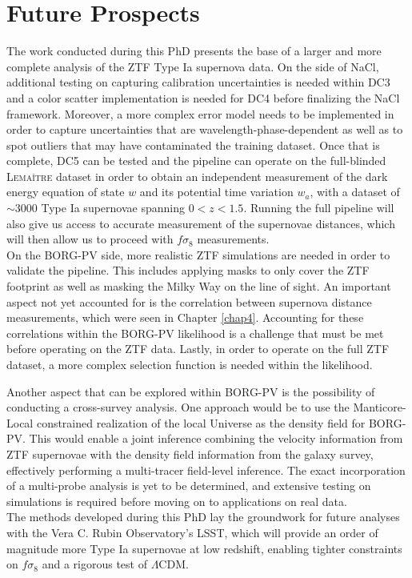 \section{Future Prospects}

The work conducted during this PhD presents the base of a larger and more complete analysis of the ZTF Type Ia supernova data. On the side of NaCl, 
additional testing on capturing calibration uncertainties is needed within DC3 and a color scatter implementation is needed for DC4 before finalizing the NaCl 
framework.  
Moreover, a more complex 
error model needs to be implemented in order to capture uncertainties that are wavelength-phase-dependent as well as to spot outliers that may have 
contaminated the training dataset. 
Once that is complete, DC5 can be tested and the pipeline can operate on the full-blinded \textsc{Lemaître} dataset 
in order to obtain 
an independent measurement of the dark energy equation of state $w$ 
and its potential time variation $w_a$, with a dataset of $\sim 3000$ 
Type Ia supernovae spanning $0 < z < 1.5$. 
Running the full pipeline will also give us access to accurate measurement of the supernovae distances, which will then allow us to proceed with $f\sigma_8$ measurements. \\


On the BORG-PV side, more realistic ZTF simulations are needed in order to validate the pipeline. This includes applying masks to only cover the ZTF footprint 
as well as masking the Milky Way on the line of sight. 
An important aspect not yet accounted for is the correlation between 
supernova distance measurements, which were seen in Chapter \ref{chap4}. 
Accounting for these correlations within the BORG-PV likelihood is a challenge that must be met before operating on the ZTF data. 
Lastly, in order to operate on the full ZTF dataset, a more complex selection function is needed within the likelihood. 

Another aspect that can be explored within BORG-PV is the possibility of conducting a cross-survey analysis. 
One approach would be to use the Manticore-Local constrained realization 
of the local Universe as the density field for BORG-PV. 
This would enable a joint inference 
combining the velocity information from ZTF supernovae with the density 
field information from the galaxy survey, effectively performing a 
multi-tracer field-level inference. 
The exact incorporation of a multi-probe analysis is yet to be determined, and extensive testing on simulations is required before moving on to applications on real data. \\

The methods developed during this PhD lay the groundwork for future 
analyses with the Vera C. Rubin Observatory's LSST, which will provide 
an order of magnitude more Type Ia supernovae at low redshift, enabling 
tighter constraints on $f\sigma_8$ and a rigorous test of $\Lambda$CDM.



